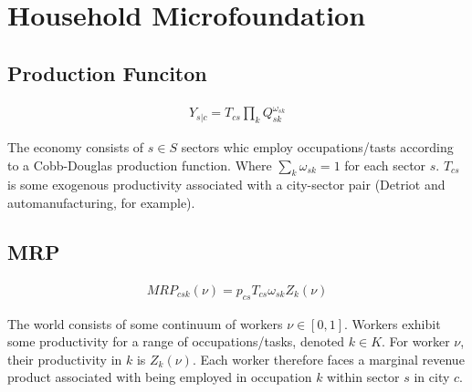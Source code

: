 \documentclass[10pt]{article}
\begin{document}





\section{Household Microfoundation}

\subsection{Production Funciton}

\begin{align}
    Y_{s | c} = T_{cs} \prod_{k} Q_{sk}^{\omega_{sk}}
\end{align}

The economy consists of $s \in S$ sectors whic employ occupations/tasts according to a Cobb-Douglas production function. Where $\sum_{k}^{} \omega_{sk} = 1$ for each sector $s$. $T_{cs}$ is some exogenous productivity associated with a city-sector pair (Detriot and automanufacturing, for example).

\subsection{MRP}

\begin{align}
    {MRP}_{csk}(\nu) = {p_{cs}}{T_{cs}}{\omega_{sk}}{Z_{k}(\nu)}
\end{align}

The world consists of some continuum of workers $\nu \in [0, 1]$. Workers exhibit some productivity for a range of occupations/tasks, denoted $k \in K$. For worker $\nu$, their productivity in $k$ is $Z_{k}(\nu)$. Each worker therefore faces a marginal revenue product associated with being employed in occupation $k$ within sector $s$ in city $c$.
\end{document}
